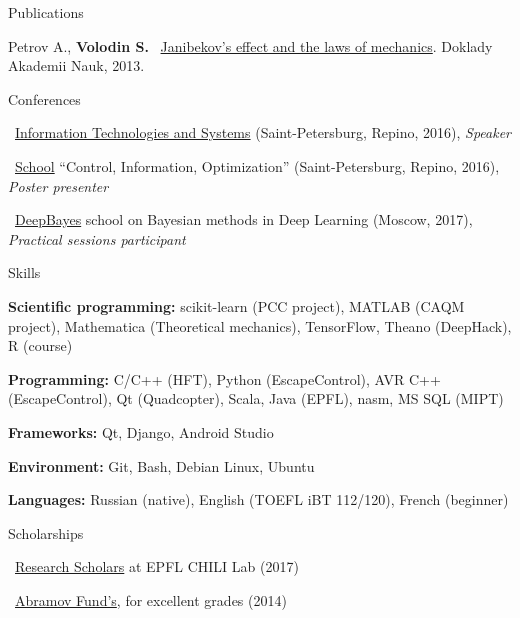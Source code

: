\documentclass{resume} %
\begin{document}
\begin{rSection}{Publications}
\item Petrov A., {\bf Volodin S.} \faExternalLink~\href{https://link.springer.com/article/10.1134/S1028335813080041}{Janibekov's effect and the laws of mechanics}. Doklady Akademii Nauk, 2013.
\end{rSection}

\begin{rSection}{Conferences}
\item \faExternalLink~\href{http://iitp.ru/en/conferences/itas}{Information Technologies and Systems} (Saint-Petersburg, Repino, 2016){, \em Speaker}
\item \faExternalLink~\href{https://sites.google.com/site/traditionalschool/about}{School} ``Control, Information, Optimization'' (Saint-Petersburg, Repino, 2016){, \em Poster presenter}
\item \faExternalLink~\href{http://deepbayes.ru}{DeepBayes} school on Bayesian methods in Deep Learning (Moscow, 2017){, \em Practical sessions participant}
\end{rSection}

\begin{rSection}{Skills}
	\item {\bf Scientific programming:} scikit-learn (PCC project), MATLAB (CAQM project), Mathematica (Theoretical mechanics), TensorFlow, Theano (DeepHack), R (course)
	\item {\bf Programming:} C/C++ (HFT), Python (EscapeControl), AVR C++ (EscapeControl), Qt (Quadcopter), Scala, Java (EPFL), nasm, MS SQL (MIPT)
	\item {\bf Frameworks:} Qt, Django, Android Studio
	\item {\bf Environment:} Git, Bash, Debian Linux, Ubuntu
	\item {\bf Languages:} Russian (native), English (TOEFL iBT 112/120), French (beginner)
\end{rSection}

\begin{rSection}{Scholarships}
\item \faExternalLink~\href{https://ic.epfl.ch/ResearchScholars}{Research Scholars} at EPFL CHILI Lab (2017)
\item \faExternalLink~\href{http://phystech-foundation.org/}{Abramov Fund's}, for excellent grades (2014)
\end{rSection}
\end{document}
